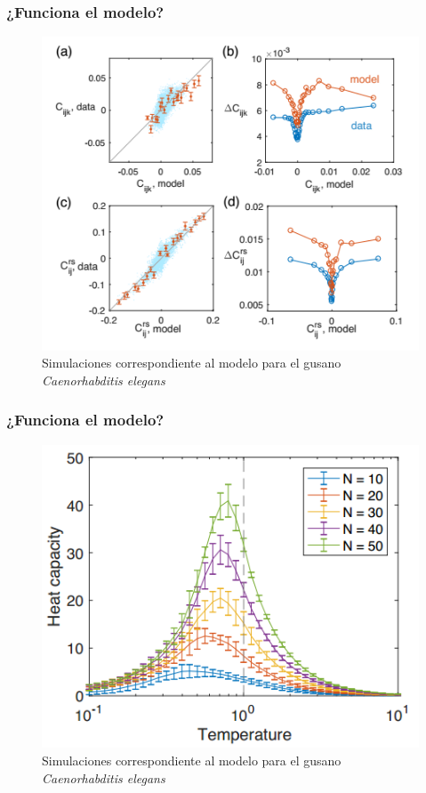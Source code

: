 \documentclass{beamer}
\begin{document}
\begin{frame}
\frametitle{¿Funciona el modelo?}
\begin{figure}
\centering
\includegraphics[scale=0.3]{fig/celeganscomparacion.png}
\caption{Simulaciones correspondiente al modelo para el gusano \textit{Caenorhabditis elegans}}


\end{figure}
\end{frame}
\begin{frame}
\frametitle{¿Funciona el modelo?}
\begin{figure}
\centering
\includegraphics[scale=0.3]{fig/celeganstemperatura.png}
\caption{Simulaciones correspondiente al modelo para el gusano \textit{Caenorhabditis elegans}}


\end{figure}
\end{frame}
  
\end{document}
